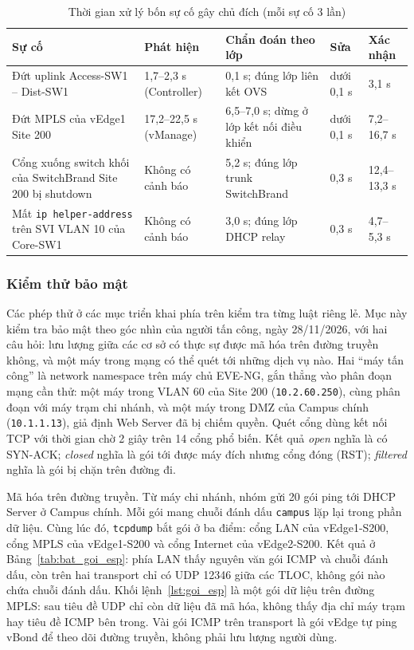 \begin{table}[H]
    \centering
    \small
    \caption{Thời gian xử lý bốn sự cố gây chủ đích (mỗi sự cố 3 lần)}
    \label{tab:xu_ly_su_co}
    \begin{tabularx}{\textwidth}{|L{3.6cm}|L{2.4cm}|Y|P{1.9cm}|P{2.0cm}|}
        \hline
        \textbf{Sự cố} & \textbf{Phát hiện} & \textbf{Chẩn đoán theo lớp} & \textbf{Sửa} & \textbf{Xác nhận} \\
        \hline
        Đứt uplink Access-SW1 -- Dist-SW1 & 1,7--2,3 s (Controller) & 0,1 s; đúng lớp liên kết OVS & dưới 0,1 s & 3,1 s \\
        \hline
        Đứt MPLS của vEdge1 Site 200 & 17,2--22,5 s (vManage) & 6,5--7,0 s; dừng ở lớp kết nối điều khiển & dưới 0,1 s & 7,2--16,7 s \\
        \hline
        Cổng xuống switch khối của SwitchBrand Site 200 bị shutdown & Không có cảnh báo & 5,2 s; đúng lớp trunk SwitchBrand & 0,3 s & 12,4--13,3 s \\
        \hline
        Mất \texttt{ip helper-address} trên SVI VLAN 10 của Core-SW1 & Không có cảnh báo & 3,0 s; đúng lớp DHCP relay & 0,3 s & 4,7--5,3 s \\
        \hline
    \end{tabularx}
\end{table}

\subsubsection{Kiểm thử bảo mật}\label{sec:kiem_thu_bao_mat}

Các phép thử ở các mục triển khai phía trên kiểm tra từng luật riêng lẻ. Mục này kiểm tra bảo mật theo góc nhìn của người tấn công, ngày 28/11/2026, với hai câu hỏi: lưu lượng giữa các cơ sở có thực sự được mã hóa trên đường truyền không, và một máy trong mạng có thể quét tới những dịch vụ nào. Hai ``máy tấn công'' là network namespace trên máy chủ EVE-NG, gắn thẳng vào phân đoạn mạng cần thử: một máy trong VLAN 60 của Site 200 (\texttt{10.2.60.250}), cùng phân đoạn với máy trạm chi nhánh, và một máy trong DMZ của Campus chính (\texttt{10.1.1.13}), giả định Web Server đã bị chiếm quyền. Quét cổng dùng kết nối TCP với thời gian chờ 2 giây trên 14 cổng phổ biến. Kết quả \textit{open} nghĩa là có SYN-ACK; \textit{closed} nghĩa là gói tới được máy đích nhưng cổng đóng (RST); \textit{filtered} nghĩa là gói bị chặn trên đường đi.

Mã hóa trên đường truyền. Từ máy chi nhánh, nhóm gửi 20 gói ping tới DHCP Server ở Campus chính. Mỗi gói mang chuỗi đánh dấu \texttt{campus} lặp lại trong phần dữ liệu. Cùng lúc đó, \texttt{tcpdump} bắt gói ở ba điểm: cổng LAN của vEdge1-S200, cổng MPLS của vEdge1-S200 và cổng Internet của vEdge2-S200. Kết quả ở Bảng~\ref{tab:bat_goi_esp}: phía LAN thấy nguyên văn gói ICMP và chuỗi đánh dấu, còn trên hai transport chỉ có UDP 12346 giữa các TLOC, không gói nào chứa chuỗi đánh dấu. Khối lệnh~\ref{lst:goi_esp} là một gói dữ liệu trên đường MPLS: sau tiêu đề UDP chỉ còn dữ liệu đã mã hóa, không thấy địa chỉ máy trạm hay tiêu đề ICMP bên trong. Vài gói ICMP trên transport là gói vEdge tự ping vBond để theo dõi đường truyền, không phải lưu lượng người dùng.

